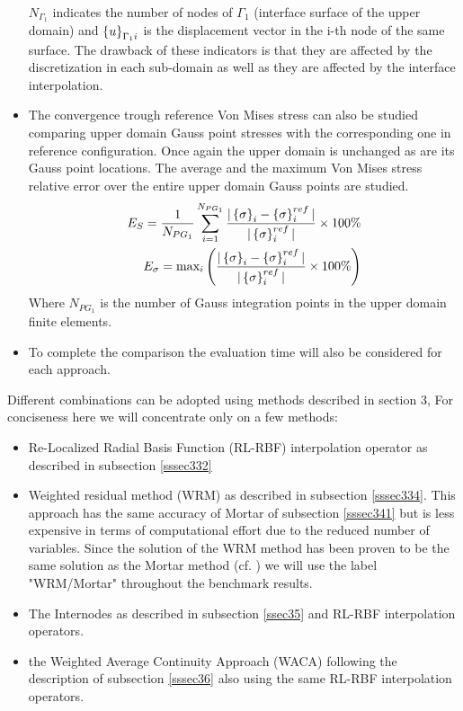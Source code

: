 \begin{itemize}
\begin{eqnarray}
 \end{eqnarray}
 $N_{\Gamma_1}$ indicates the number of nodes of $\Gamma_1$ (interface surface  of the upper domain) and $\left\lbrace{u}\right \rbrace_{\Gamma_1i}$ is the displacement vector in the i-th node of the same surface.
 The drawback of these indicators is that they are affected by the discretization in each sub-domain as well as they are affected by the interface interpolation.
 \item The convergence trough reference Von Mises stress can also be studied comparing upper domain Gauss point stresses with the corresponding one in reference configuration. Once again the upper domain is unchanged as are its Gauss point locations. The average and the maximum Von Mises stress relative error over the entire upper domain Gauss points are studied.
 \begin{eqnarray}
 E_{S}=\frac{1}{N_{PG_1}}\sum_{i=1}^{N_{PG_1}}\frac{|\left\lbrace{\sigma}\right \rbrace_{i}-\left\lbrace{\sigma}\right \rbrace^{ref}_{i}|}{|\left\lbrace{\sigma}\right \rbrace^{ref}_{i}|}\times 100 \%  \\
 E_{\sigma}=
 \text{max}_i
  \left(\frac{|\left\lbrace{\sigma}\right \rbrace_{i}-\left\lbrace{\sigma}\right \rbrace^{ref}_{i}|}{|\left\lbrace{\sigma}\right \rbrace^{ref}_{i}|}\times 100 \%   \right) 
 \end{eqnarray}
 Where $N_{PG_1}$ is the number of Gauss integration points in the upper domain finite elements.
 \item To complete the comparison the evaluation time will also be considered for each approach.
 \end{itemize}
 Different combinations can be adopted using methods described in section 3, For conciseness here we will concentrate only on a few methods:
 \begin{itemize}
     \item Re-Localized Radial Basis Function (RL-RBF) interpolation operator as described in subsection \ref{sssec332}
     \item Weighted residual method (WRM) as described in subsection \ref{sssec334}. This approach has the same accuracy of Mortar of subsection \ref{sssec341} but is less expensive in terms of computational effort due to the reduced number of variables. Since the solution of the WRM method has been proven to be the same solution as the Mortar method (cf. \cite{jeong2017element}) we will use the label "WRM/Mortar" throughout the benchmark results.
     \item The Internodes as described in subsection \ref{ssec35} and RL-RBF interpolation operators. 
     \item the Weighted Average Continuity Approach (WACA) following the description of subsection \ref{sssec36} also using the same RL-RBF interpolation operators.
 \end{itemize}
